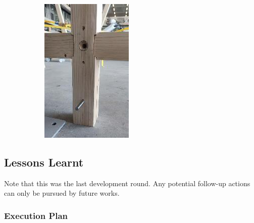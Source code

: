 \documentclass[11pt]{book}
\begin{document}
{{\begin{figure}[H]
\begin{subfigure}[b]{0.45\textwidth}
\includegraphics[width=\textwidth]{./images/image26.jpeg}
\end{subfigure}
\end{figure}
}}

\subsection{Lessons Learnt}

Note that this was the last development round. Any potential follow-up actions can only be pursued by future works.

\subsubsection{Execution Plan}
\end{document}
